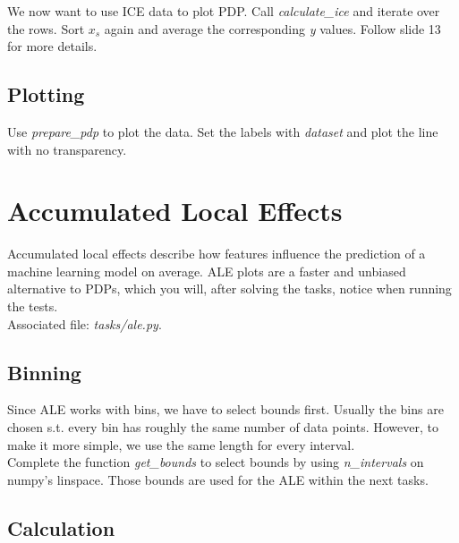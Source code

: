 \documentclass[a4paper]{article}
\begin{document}
\noindent We now want to use ICE data to plot PDP. Call \textit{calculate\_ice} and iterate over the rows. Sort $x_s$ again and average the corresponding \textit{y} values. Follow slide 13 for more details.


\subsection{Plotting}

\noindent Use \textit{prepare\_pdp} to plot the data. Set the labels with \textit{dataset} and plot the line with no transparency.


\section{Accumulated Local Effects}

Accumulated local effects describe how features influence the prediction of a machine learning model on average. ALE plots are a faster and unbiased alternative to PDPs, which you will, after solving the tasks, notice when running the tests.\\

\noindent Associated file: \textit{tasks/ale.py}.


\subsection{Binning}

\noindent Since ALE works with bins, we have to select bounds first. Usually the bins are chosen s.t. every bin has roughly the same number of data points. However, to make it more simple, we use the same length for every interval.\\

\noindent Complete the function \textit{get\_bounds} to select bounds by using \textit{n\_intervals} on numpy's linspace. Those bounds are used for the ALE within the next tasks.


\subsection{Calculation}
\end{document}
